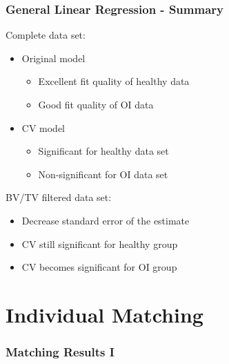 \documentclass[xcolor=table]{beamer}
\begin{document}
\begin{frame}
	\frametitle{General Linear Regression - Summary}
	Complete data set:
	\begin{itemize}
		\item Original model
		\begin{itemize}
			\item Excellent fit quality of healthy data
			\item Good fit quality of OI data
		\end{itemize} 
		\item CV model
		\begin{itemize}
			\item Significant for healthy data set
			\item Non-significant for OI data set
		\end{itemize}
	\end{itemize}
	\vspace{0.25cm}
	BV/TV filtered data set:
	\begin{itemize}
		\item Decrease standard error of the estimate
		\item CV still significant for healthy group
		\item CV becomes significant for OI group
	\end{itemize} 

\end{frame}




\section{Individual Matching}

\begin{frame}
	\frametitle{Matching Results I}
	\vspace{-5mm}
	\begin{columns}[c] 
		\hspace{5mm}
		\begin{figure}
			\hspace{-15mm}
			\captionsetup[subfigure]{labelformat=empty}
			\qquad
			\qquad\\
			\hspace{-15mm}
			\qquad
		\end{figure}
	\end{columns}
\end{frame}
\end{document}
